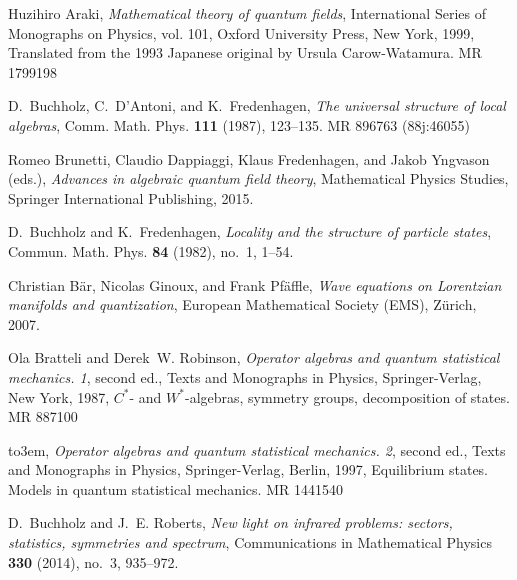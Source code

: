 \documentclass[12pt]{article}
\newcommand{\1}{\mathds{1}}                         %
\begin{document}
\providecommand{\bysame}{\leavevmode\hbox to3em{\hrulefill}\thinspace}
\providecommand{\MR}{\relax\ifhmode\unskip\space\fi MR }
\providecommand{\MRhref}[2]{%
	\href{http://www.ams.org/mathscinet-getitem?mr=#1}{#2}
}
\providecommand{\href}[2]{#2}
\small{\begin{thebibliography}{BDFY15}
	
	Huzihiro Araki, \emph{Mathematical theory of quantum fields}, International
	Series of Monographs on Physics, vol. 101, Oxford University Press, New York,
	1999, Translated from the 1993 Japanese original by Ursula Carow-Watamura.
	\MR{1799198}
	
	D.~Buchholz, C.~D'Antoni, and K.~Fredenhagen, \emph{The universal structure of
		local algebras}, Comm. Math. Phys. \textbf{111} (1987), 123--135. \MR{896763
		(88j:46055)}
	
	Romeo Brunetti, Claudio Dappiaggi, Klaus Fredenhagen, and Jakob Yngvason
	(eds.), \emph{Advances in algebraic quantum field theory}, Mathematical
	Physics Studies, Springer International Publishing, 2015.
	
	D.~Buchholz and K.~Fredenhagen, \emph{Locality and the structure of particle
		states}, Commun. Math. Phys. \textbf{84} (1982), no.~1, 1--54.
	
	Christian B{\"{a}}r, Nicolas Ginoux, and Frank Pf{\"{a}}ffle, \emph{Wave
		equations on {L}orentzian manifolds and quantization}, European Mathematical
	Society (EMS), Z{\"{u}}rich, 2007.
	
	Ola Bratteli and Derek~W. Robinson, \emph{Operator algebras and quantum
		statistical mechanics. 1}, second ed., Texts and Monographs in Physics,
	Springer-Verlag, New York, 1987, $C^\ast$- and $W^\ast$-algebras, symmetry
	groups, decomposition of states. \MR{887100}
	
	\bysame, \emph{Operator algebras and quantum statistical mechanics. 2}, second
	ed., Texts and Monographs in Physics, Springer-Verlag, Berlin, 1997,
	Equilibrium states. Models in quantum statistical mechanics. \MR{1441540}
	
	D.~Buchholz and J.~E. Roberts, \emph{New light on infrared problems: sectors,
		statistics, symmetries and spectrum}, Communications in Mathematical Physics
	\textbf{330} (2014), no.~3, 935--972.
	

\end{thebibliography}}
\end{document}
